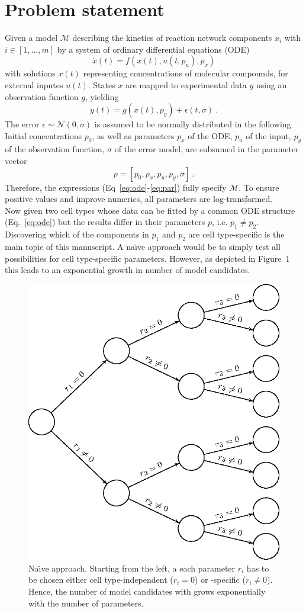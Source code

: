 \documentclass{bioinfo}
\begin{document}
\section{Problem statement}

Given a model $\mathcal M$ describing the kinetics of reaction network components $x_i$ with $i \in [1,\dots,m]$ by a system of ordinary differential equations (ODE)
\begin{equation}
\dot x(t) = f(x(t),u(t,p_u),p_x)\label{eq:ode}
\end{equation}
with solutions $x(t)$ representing concentrations of molecular compounds, for external inputes $u(t)$.
States $x$ are mapped to experimental data $y$ using an observation function $g$, yielding
\begin{equation}
y(t) = g(x(t),p_y)+\epsilon(t,\sigma) \:.\label{eq:obs}
\end{equation}
The error $\epsilon \sim \mathcal N(0,\sigma)$ is assumed to be normally distributed in the following.
Initial concentrations $p_0$, as well as parameters $p_x$ of the ODE, $p_u$ of the input, $p_y$ of the observation function, $\sigma$ of the error model, are subsumed in the parameter vector
\begin{equation}
p = [p_0, p_x, p_u, p_y, \sigma] \:.\label{eq:par}
\end{equation}
Therefore, the expressions (Eq~\ref{eq:ode}-\ref{eq:par}) fully specify $\mathcal M$.
To ensure positive values and improve numerics, all parameters are log-transformed.\\
Now given two cell types whose data can be fitted by a common ODE structure (Eq.~\ref{eq:ode}) but the results differ in their parameters $p$, i.e. $p_1 \neq p_2$.
Discovering which of the components in $p_1$ and $p_2$ are cell type-specific is the main topic of this manuscript.
A na\"{\i}ve approach would be to simply test all possibilities for cell type-specific parameters.
However, as depicted in Figure~1\vphantom{\ref{fig:01}} this leads to an exponential growth in number of model candidates.

\begin{figure}[!tpb]%
\centerline{\includegraphics[width=.4\textwidth]{Figures/tree.eps}}
\caption{Na\"{\i}ve approach. Starting from the left, a each parameter $r_i$ has to be chosen either cell type-independent ($r_i=0$) or -specific ($r_i\neq 0$). Hence, the number of model candidates with grows exponentially with the number of parameters.}\label{fig:01}
\end{figure}
\end{document}
